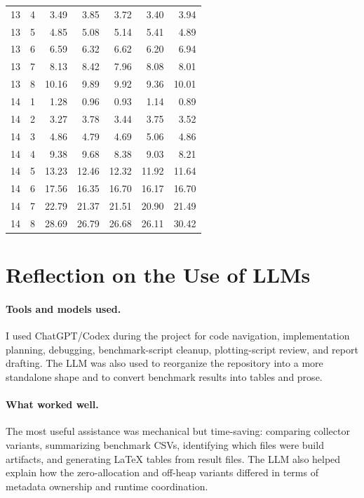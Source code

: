 \documentclass[11pt,a4paper]{article}
\begin{document}
\begin{longtable}{rrrrrrr}
13 & 4 & 3.49 & 3.85 & 3.72 & 3.40 & 3.94 \\
13 & 5 & 4.85 & 5.08 & 5.14 & 5.41 & 4.89 \\
13 & 6 & 6.59 & 6.32 & 6.62 & 6.20 & 6.94 \\
13 & 7 & 8.13 & 8.42 & 7.96 & 8.08 & 8.01 \\
13 & 8 & 10.16 & 9.89 & 9.92 & 9.36 & 10.01 \\
14 & 1 & 1.28 & 0.96 & 0.93 & 1.14 & 0.89 \\
14 & 2 & 3.27 & 3.78 & 3.44 & 3.75 & 3.52 \\
14 & 3 & 4.86 & 4.79 & 4.69 & 5.06 & 4.86 \\
14 & 4 & 9.38 & 9.68 & 8.38 & 9.03 & 8.21 \\
14 & 5 & 13.23 & 12.46 & 12.32 & 11.92 & 11.64 \\
14 & 6 & 17.56 & 16.35 & 16.70 & 16.17 & 16.70 \\
14 & 7 & 22.79 & 21.37 & 21.51 & 20.90 & 21.49 \\
14 & 8 & 28.69 & 26.79 & 26.68 & 26.11 & 30.42 \\
\bottomrule
\end{longtable}

\section{Reflection on the Use of LLMs}
\label{sec:llm}

\paragraph{Tools and models used.}
I used ChatGPT/Codex during the project for code navigation, implementation
planning, debugging, benchmark-script cleanup, plotting-script review, and
report drafting. The LLM was also used to reorganize the repository into a more
standalone shape and to convert benchmark results into tables and prose.

\paragraph{What worked well.}
The most useful assistance was mechanical but time-saving: comparing collector
variants, summarizing benchmark CSVs, identifying which files were build
artifacts, and generating LaTeX tables from result files. The LLM also helped
explain how the zero-allocation and off-heap variants differed in terms of
metadata ownership and runtime coordination.
\end{document}
